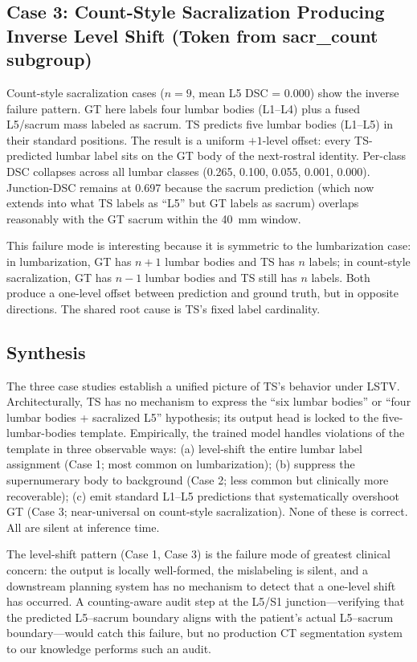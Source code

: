 \documentclass{article}
\begin{document}
\subsection{Case 3: Count-Style Sacralization Producing Inverse
            Level Shift (Token from sacr\_count subgroup)}
\label{sec:case_sacr_count}

Count-style sacralization cases ($n=9$, mean L5 DSC = 0.000)
show the inverse failure pattern.
GT here labels four lumbar bodies (L1--L4) plus a fused
L5/sacrum mass labeled as sacrum.
TS predicts five lumbar bodies (L1--L5) in their standard
positions.
The result is a uniform $+1$-level offset: every TS-predicted
lumbar label sits on the GT body of the next-rostral identity.
Per-class DSC collapses across all lumbar classes
(0.265, 0.100, 0.055, 0.001, 0.000).
Junction-DSC remains at 0.697 because the sacrum prediction
(which now extends into what TS labels as ``L5'' but GT labels as
sacrum) overlaps reasonably with the GT sacrum within the 40~mm
window.

This failure mode is interesting because it is symmetric to the
lumbarization case: in lumbarization, GT has $n+1$ lumbar bodies
and TS has $n$ labels; in count-style sacralization, GT has $n-1$
lumbar bodies and TS still has $n$ labels.
Both produce a one-level offset between prediction and ground
truth, but in opposite directions.
The shared root cause is TS's fixed label cardinality.

\subsection{Synthesis}

The three case studies establish a unified picture of TS's
behavior under LSTV.
Architecturally, TS has no mechanism to express the
``six lumbar bodies'' or ``four lumbar bodies + sacralized L5''
hypothesis; its output head is locked to the five-lumbar-bodies
template.
Empirically, the trained model handles violations of the template
in three observable ways: (a) level-shift the entire lumbar label
assignment (Case 1; most common on lumbarization); (b) suppress
the supernumerary body to background (Case 2; less common but
clinically more recoverable); (c) emit standard L1--L5 predictions
that systematically overshoot GT (Case 3; near-universal on
count-style sacralization).
None of these is correct.
All are silent at inference time.

The level-shift pattern (Case 1, Case 3) is the failure mode of
greatest clinical concern: the output is locally well-formed, the
mislabeling is silent, and a downstream planning system has no
mechanism to detect that a one-level shift has occurred.
A counting-aware audit step at the L5/S1 junction---verifying
that the predicted L5--sacrum boundary aligns with the
patient's actual L5--sacrum boundary---would catch this failure,
but no production CT segmentation system to our knowledge
performs such an audit.
\end{document}
